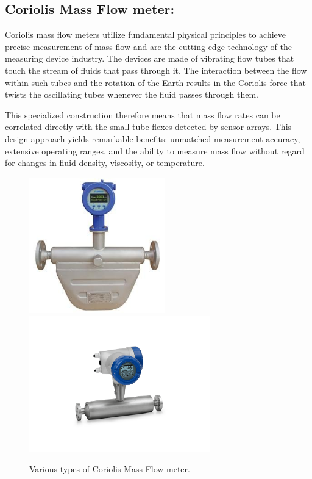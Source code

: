 \subsection{Coriolis Mass Flow meter:}

Coriolis mass flow meters utilize fundamental physical principles to achieve precise measurement of mass flow and are the cutting-edge technology of the measuring device industry. The devices are made of vibrating flow tubes that touch the stream of fluids that pass through it. The interaction between the flow within such tubes and the rotation of the Earth results in the Coriolis force that twists the oscillating tubes whenever the fluid passes through them.

This specialized construction therefore means that mass flow rates can be correlated directly with the small tube flexes detected by sensor arrays. This design approach yields remarkable benefits: unmatched measurement accuracy, extensive operating ranges, and the ability to measure mass flow without regard for changes in fluid density, viscosity, or temperature.


\begin{figure}[h!]
    \centering
    \includegraphics[width=2.31944in,height=2.31944in]{figs/flowmeters/image11.jpg}\includegraphics[width=3.09375in,height=2.31944in]{figs/flowmeters/image12.png}
    \caption{Various types of Coriolis Mass Flow meter.}
    \label{fig:Various types of Coriolis Mass Flow meter.}
\end{figure}

